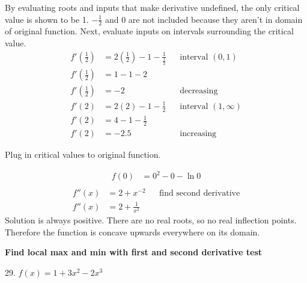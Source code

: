\documentclass{article}
\begin{document}
\begin{description}
\begin{description}
                By evaluating roots and inputs that make derivative undefined, the only critical value is shown to be 1. $-\frac{1}{2}$ and 0 are not
                included because they aren't in domain of original function. Next, evaluate inputs on intervals surrounding the critical value.
                \begin{align*}
                  f'(\frac{1}{2}) & = 2\left(\frac{1}{2}\right) - 1 - \frac{1}{\frac{1}{2}} &  & \text{interval $(0, 1)$}      \\
                  f'(\frac{1}{2}) & = 1 - 1 - 2                                                                                \\
                  f'(\frac{1}{2}) & = -2                                                    &  & \text{decreasing}             \\[2em]
                  f'(2)           & = 2(2) - 1 - \frac{1}{2}                                &  & \text{interval $(1, \infty)$} \\
                  f'(2)           & = 4 - 1 -  \frac{1}{2}                                                                     \\
                  f'(2)           & = -2.5                                                  &  & \text{increasing}
                \end{align*}

                Plug in critical values to original function.

                \begin{align*}
                  f(0) & = 0^2 - 0 - \ln{0} \\
                \end{align*}
                \begin{align*}
                  f''(x) & = 2 +x^{-2}           &  & \text{find second derivative} \\
                  f''(x) & = 2 + \frac{1}{x^{2}}
                \end{align*}
                Solution is always positive. There are no real roots, so no real inflection points. Therefore the function is concave upwards
                everywhere on its domain.
        \end{description}
  \item\textbf{Find local max and min with first and second derivative test}
        \begin{description}
          \setlength\itemsep{3em}
          \item 29. $f(x) = 1 + 3x^2 - 2x^3$


\end{description}
\end{description}
\end{document}
